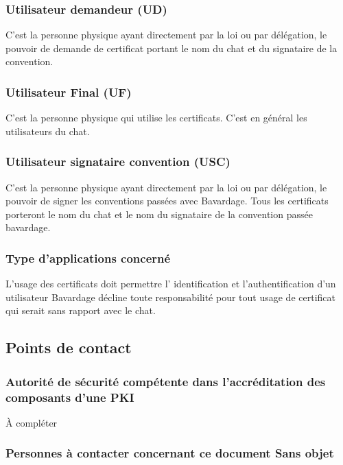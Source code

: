 \documentclass[a4paper,11pt,french]{article}
\begin{document}
\subsubsection{ Utilisateur demandeur (UD)}

C'est la personne physique ayant directement par la loi ou par délégation, le pouvoir de demande de certificat portant le nom du chat et du signataire de la convention.

\subsubsection{ Utilisateur Final (UF)}

C'est la personne physique qui utilise les certificats. C'est en général les utilisateurs du chat.

\subsubsection{Utilisateur signataire convention (USC)}

C'est la personne physique ayant directement par la loi ou par délégation, le pouvoir de signer les conventions passées avec Bavardage. Tous les certificats porteront le nom du chat et le nom du signataire de la convention passée bavardage. 
		
\subsubsection{Type d'applications concerné}

L'usage des certificats doit permettre l' identification et l'authentification d'un utilisateur Bavardage décline toute responsabilité pour tout usage de certificat qui serait sans rapport avec le chat.

\subsection{Points de contact}
\subsubsection{Autorité de sécurité compétente dans l'accréditation des composants d'une PKI}
		À compléter
		
\subsubsection{Personnes à contacter concernant ce document
Sans objet}		
\end{document}
